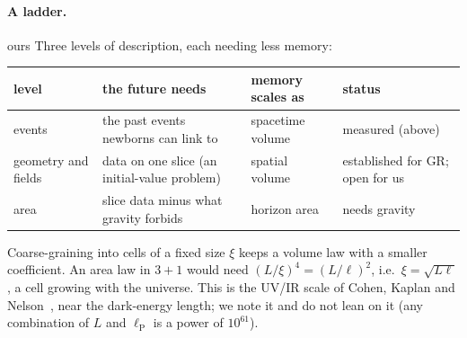 \documentclass[11pt,a4paper]{article}
\newcommand{\tagbox}[2]{\textsf{\scriptsize\colorbox{#1!12}{\textcolor{#1!70!black}{#2}}}}
\newcommand{\est}{\tagbox{gray}{established}}
\newcommand{\ours}{\tagbox{orange}{ours}}
\newcommand{\lP}{\ell_{\mathrm P}}
\begin{document}
\paragraph{A ladder.} \ours{} Three levels of description, each needing less memory:
\begin{center}\small
\begin{tabular}{@{}l>{\raggedright}p{}l>{\raggedright\arraybackslash}p{}@{}}
\toprule
level & the future needs & memory scales as & status\\
\midrule
events & the past events newborns can link to & spacetime volume & measured (above)\\
geometry and fields & data on one slice (an initial-value problem) & spatial volume & \est{} for GR; open for us\\
area & slice data minus what gravity forbids & horizon area & needs gravity\\
\bottomrule
\end{tabular}
\end{center}
Coarse-graining into cells of a fixed size $\xi$ keeps a volume law with a smaller coefficient. An area law in $3+1$ would need $(L/\xi)^4=(L/\ell)^2$, i.e.\ $\xi=\sqrt{L\ell}$, a cell growing with the universe. This is the UV/IR scale of Cohen, Kaplan and Nelson~\cite{CKN99}, near the dark-energy length; we note it and do not lean on it (any combination of $L$ and $\lP$ is a power of $10^{61}$).
\end{document}

